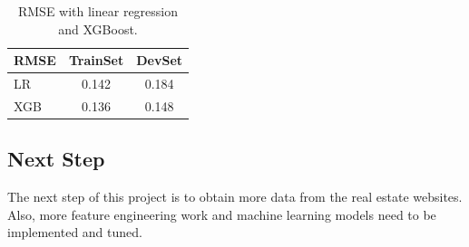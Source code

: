 \documentclass{article} %
\begin{document}
\begin{table}[h]
	\begin{center}
		\begin{tabular}{|l|cc|}
			\hline
			RMSE &
			TrainSet &
			DevSet \\
			\hline
			LR & 0.142 & 0.184 \\
			\hline
			XGB & 0.136 & 0.148 \\
			\hline
		\end{tabular}
	\end{center}
	\caption{RMSE with linear regression and XGBoost.}
\end{table}

\subsection{Next Step}

The next step of this project is to obtain more data from the real estate websites.
Also, more feature engineering work and machine learning models need to be implemented and tuned.

{\small
	
	
}
\end{document}
